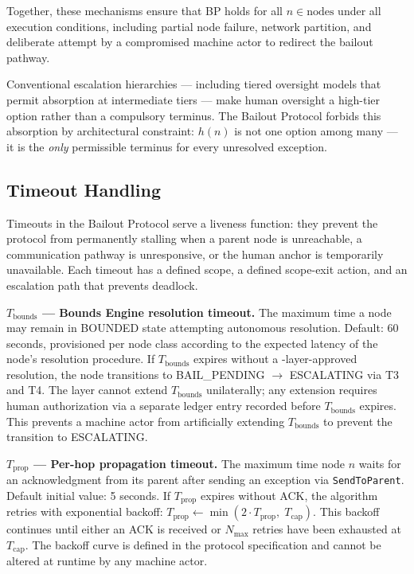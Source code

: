 Together, these mechanisms ensure that BP holds for all $n \in \text{nodes}$ under all execution conditions, including partial node failure, network partition, and deliberate attempt by a compromised machine actor to redirect the bailout pathway.

Conventional escalation hierarchies — including tiered oversight models that permit absorption at intermediate tiers — make human oversight a high-tier option rather than a compulsory terminus. The Bailout Protocol forbids this absorption by architectural constraint: $h(n)$ is not one option among many — it is the \emph{only} permissible terminus for every unresolved exception.

\subsection{Timeout Handling}\label{sec:timeout-handling}

Timeouts in the Bailout Protocol serve a liveness function: they prevent the protocol from permanently stalling when a parent node is unreachable, a communication pathway is unresponsive, or the human anchor is temporarily unavailable. Each timeout has a defined scope, a defined scope-exit action, and an escalation path that prevents deadlock.

\bigskip
\noindent\textbf{$T_{\text{bounds}}$ — Bounds Engine resolution timeout.}
The maximum time a node may remain in BOUNDED state attempting autonomous resolution. Default: 60 seconds, provisioned per node class according to the expected latency of the node's resolution procedure. If $T_{\text{bounds}}$ expires without a \fact-layer-approved resolution, the node transitions to BAIL\_PENDING $\rightarrow$ ESCALATING via T3 and T4. The \fact{} layer cannot extend $T_{\text{bounds}}$ unilaterally; any extension requires human authorization via a separate ledger entry recorded before $T_{\text{bounds}}$ expires. This prevents a machine actor from artificially extending $T_{\text{bounds}}$ to prevent the transition to ESCALATING.

\bigskip
\noindent\textbf{$T_{\text{prop}}$ — Per-hop propagation timeout.}
The maximum time node $n$ waits for an acknowledgment from its parent after sending an exception via \texttt{SendToParent}. Default initial value: 5 seconds. If $T_{\text{prop}}$ expires without ACK, the algorithm retries with exponential backoff: $T_{\text{prop}} \leftarrow \min(2 \cdot T_{\text{prop}},\; T_{\text{cap}})$. This backoff continues until either an ACK is received or $N_{\max}$ retries have been exhausted at $T_{\text{cap}}$. The backoff curve is defined in the protocol specification and cannot be altered at runtime by any machine actor.

